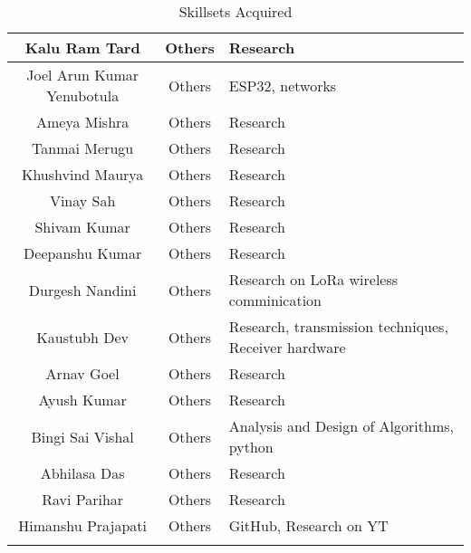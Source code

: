 \begin{center}
\begin{longtable}{ | c | c | m{6cm} | }
        \hline
        Kalu Ram Tard              & Others            & Research                                                                \\
        \hline
        Joel Arun Kumar Yenubotula & Others            & ESP32, networks                                                         \\
        \hline
        Ameya Mishra               & Others            & Research                                                                \\
        \hline
        Tanmai Merugu              & Others            & Research                                                                \\
        \hline
        Khushvind Maurya           & Others            & Research                                                                \\
        \hline
        Vinay Sah                  & Others            & Research                                                                \\
        \hline
        Shivam Kumar               & Others            & Research                                                                \\
        \hline
        Deepanshu Kumar            & Others            & Research                                                                \\
        \hline
        Durgesh Nandini            & Others            & Research on LoRa wireless comminication                                 \\
        \hline
        Kaustubh Dev               & Others            & Research, transmission techniques, Receiver hardware                    \\
        \hline
        Arnav Goel                 & Others            & Research                                                                \\
        \hline
        Ayush Kumar                & Others            & Research                                                                \\
        \hline
        Bingi Sai Vishal           & Others            & Analysis and Design of Algorithms, python                               \\
        \hline
        Abhilasa Das               & Others            & Research                                                                \\
        \hline
        Ravi Parihar               & Others            & Research                                                                \\
        \hline
        Himanshu Prajapati         & Others            & GitHub, Research on YT                                                  \\
        \hline


        \hline
        \caption{Skillsets Acquired}
    \end{longtable}
\end{center}

